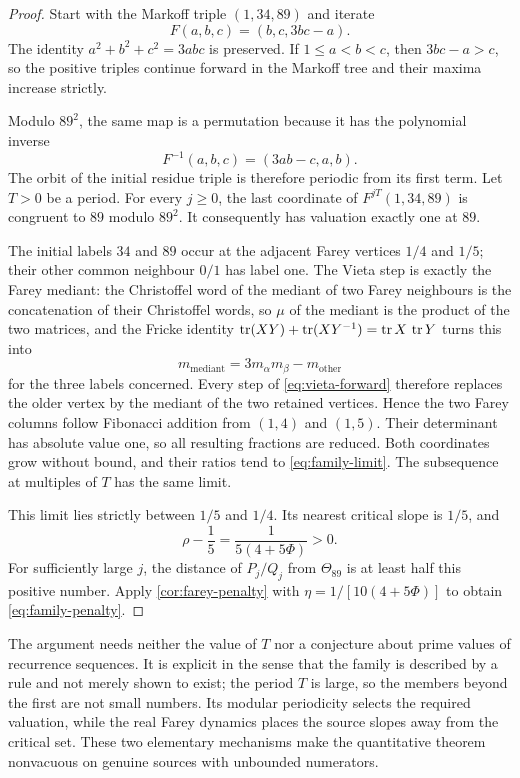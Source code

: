 \begin{proof}
Start with the Markoff triple $(1,34,89)$ and iterate
\begin{equation}
 F(a,b,c)=(b,c,3bc-a).
 \label{eq:vieta-forward}
\end{equation}
The identity $a^2+b^2+c^2=3abc$ is preserved. If $1\leqslant a<b<c$,
then $3bc-a>c$, so the positive triples continue forward in the Markoff
tree and their maxima increase strictly.

Modulo $89^2$, the same map is a permutation because it has the polynomial
inverse
$$
 F^{-1}(a,b,c)=(3ab-c,a,b).
$$
The orbit of the initial residue triple is therefore periodic from its
first term. Let $T>0$ be a period. For every $j\geqslant0$, the last
coordinate of $F^{jT}(1,34,89)$ is congruent to $89$ modulo $89^2$.
It consequently has valuation exactly one at $89$.

The initial labels $34$ and $89$ occur at the adjacent Farey vertices
$1/4$ and $1/5$; their other common neighbour $0/1$ has label one. The
Vieta step is exactly the Farey mediant: the Christoffel word of the
mediant of two Farey neighbours is the concatenation of their Christoffel
words, so $\mu$ of the mediant is the product of the two matrices, and
the Fricke identity $\operatorname{tr}(XY)+\operatorname{tr}(XY^{-1})=\operatorname{tr} X\,\operatorname{tr} Y$ turns this into
$$
 m_{\text{mediant}}=3m_\alpha m_\beta-m_{\text{other}}
$$
for the three labels concerned. Every step of \eqref{eq:vieta-forward}
therefore replaces the older vertex by the mediant of the two retained
vertices. Hence the two Farey columns follow
Fibonacci addition from $(1,4)$ and $(1,5)$. Their determinant has absolute
value one, so all resulting fractions are reduced. Both coordinates grow
without bound, and their ratios tend to \eqref{eq:family-limit}. The
subsequence at multiples of $T$ has the same limit.

This limit lies strictly between $1/5$ and $1/4$. Its nearest critical
slope is $1/5$, and
$$
 \rho-\frac15=\frac{1}{5(4+5\Phi)}>0.
$$
For sufficiently large $j$, the distance of $P_j/Q_j$ from $\Theta_{89}$
is at least half this positive number. Apply \cref{cor:farey-penalty}
with $\eta=1/[10(4+5\Phi)]$ to obtain
\eqref{eq:family-penalty}.
\end{proof}

The argument needs neither the value of $T$ nor a conjecture about prime
values of recurrence sequences. It is explicit in the sense that the
family is described by a rule and not merely shown to exist; the period
$T$ is large, so the members beyond the first are not small numbers. Its modular periodicity selects the
required valuation, while the real Farey dynamics places the source
slopes away from the critical set. These two elementary mechanisms
make the quantitative theorem nonvacuous on genuine sources with
unbounded numerators.

